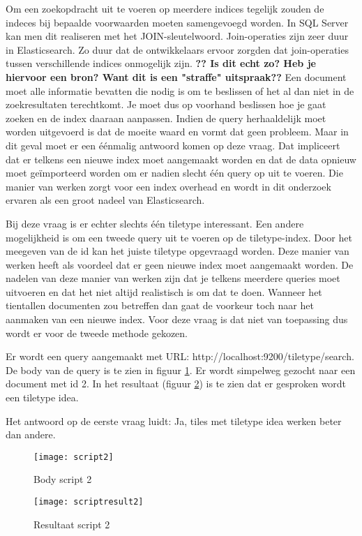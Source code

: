 Om een zoekopdracht uit te voeren op meerdere indices tegelijk zouden de indeces bij bepaalde voorwaarden moeten samengevoegd worden. In SQL Server kan men dit realiseren met het JOIN-sleutelwoord. Join-operaties zijn zeer duur in Elasticsearch. Zo duur dat de ontwikkelaars ervoor zorgden dat join-operaties tussen verschillende indices onmogelijk zijn. \textbf{?? Is dit echt zo? Heb je hiervoor een bron? Want dit is een "straffe" uitspraak??} Een document moet alle informatie bevatten die nodig is om te beslissen of het al dan niet in de zoekresultaten terechtkomt. Je moet dus op voorhand beslissen hoe je gaat zoeken en de index daaraan aanpassen. Indien de query herhaaldelijk moet worden uitgevoerd is dat de moeite waard en vormt dat geen probleem. Maar in dit geval moet er een  éénmalig antwoord komen op deze vraag. Dat impliceert dat er telkens een nieuwe index moet aangemaakt worden en dat de data opnieuw moet geïmporteerd worden om er nadien slecht één query op uit te voeren. Die manier van werken zorgt voor een index overhead en wordt in dit onderzoek ervaren als een groot nadeel van Elasticsearch.

Bij deze vraag is er echter slechts één tiletype interessant. Een andere mogelijkheid is om een tweede query uit te voeren op de tiletype-index. Door het meegeven van de id kan het juiste tiletype opgevraagd worden. Deze manier van werken heeft als voordeel dat er geen nieuwe index moet aangemaakt worden. De nadelen van deze manier van werken zijn dat je telkens meerdere queries moet uitvoeren en dat het niet altijd realistisch is om dat te doen. Wanneer het tientallen documenten zou betreffen dan gaat de voorkeur toch naar het aanmaken van een nieuwe index. Voor deze vraag is dat niet van toepassing dus wordt er voor de tweede methode gekozen.

Er wordt een query aangemaakt met URL: http://localhost:9200/tiletype/\textunderscore search. De body van de query is te zien in figuur \ref{fig:script2}. Er wordt simpelweg gezocht naar een document met id 2. In het resultaat (figuur \ref{fig:scriptresult2}) is te zien dat er gesproken wordt een tiletype idea.

Het antwoord op de eerste vraag luidt: Ja, tiles met tiletype idea werken beter dan andere.

\begin{figure}
	\centering
	\texttt{[image: script2]}
	\caption{Body script 2}
	\label{fig:script2}
\end{figure}

\begin{figure}
	\centering
	\texttt{[image: scriptresult2]}
	\caption{Resultaat script 2}
	\label{fig:scriptresult2}
\end{figure}

